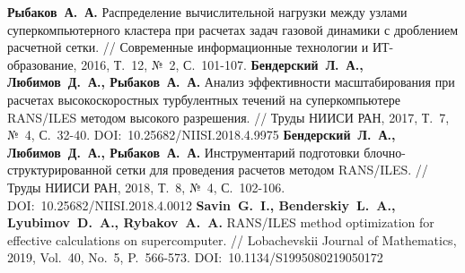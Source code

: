 \begin{thebibliography}{99}



%
%



%
%



%
\textbf{Рыбаков~А.~А.} Распределение вычислительной нагрузки между узлами суперкомпьютерного кластера при расчетах задач газовой динамики с дроблением расчетной сетки. // Современные информационные технологии и ИТ-образование, 2016, Т.~12, №~2, С.~101-107.
%
\textbf{Бендерский~Л.~А., Любимов~Д.~А., Рыбаков~А.~А.} Анализ эффективности масштабирования при расчетах высокоскоростных турбулентных течений на суперкомпьютере RANS/ILES методом высокого разрешения. // Труды НИИСИ РАН, 2017, Т.~7, №~4, С.~32-40. DOI:~10.25682/NIISI.2018.4.9975
%
\textbf{Бендерский~Л.~А., Любимов~Д.~А., Рыбаков~А.~А.} Инструментарий подготовки блочно-структурированной сетки для проведения расчетов методом RANS/ILES. // Труды НИИСИ РАН, 2018, Т.~8, №~4, С.~102-106. DOI:~10.25682/NIISI.2018.4.0012
%
\textbf{Savin~G.~I., Benderskiy~L.~A., Lyubimov~D.~A., Rybakov~A.~A.} RANS/ILES method optimization for effective calculations on supercomputer. // Lobachevskii Journal of Mathematics, 2019, Vol.~40, No.~5, P.~566-573. DOI:~10.1134/S1995080219050172
%



%
%




\end{thebibliography}
